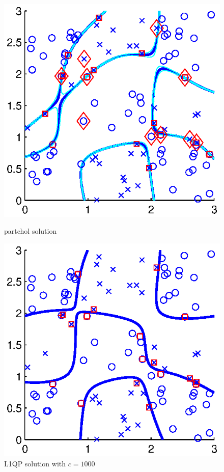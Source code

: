 \documentclass[11pt,a4paper]{article}
\theoremstyle{definition}
\begin{document}
\begin{figure}[htbp]
\begin{minipage}[t]{0.31\linewidth}
          \includegraphics[width=1\textwidth]{4_3x3_mislabel_pchol.eps}
          \caption{\label{Fig:ex5_2}\textsf{partchol} solution}
        \end{minipage}
        \begin{minipage}[t]{0.31\linewidth}
          \centering
          \includegraphics[width=1\textwidth]{4_3x3_mislabel_l1qp.eps}
          \caption{\label{Fig:ex5_3}L1QP solution with $c=1000$}
        \end{minipage}
      \end{figure}
\end{document}
